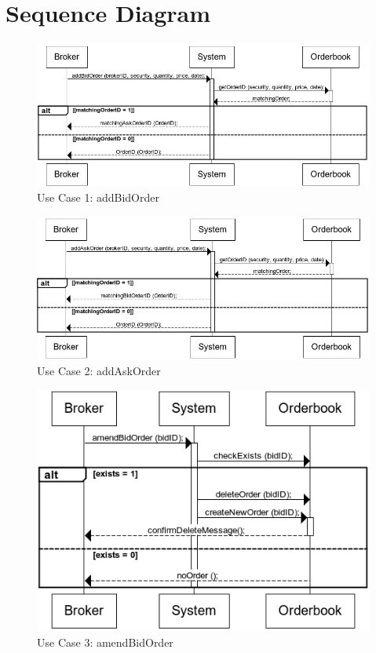 \documentclass[a4paper]{article}
\begin{document}
\section {Sequence Diagram} 

\begin{figure}[h]
  \caption{Use Case 1: addBidOrder}
  \centering
    \includegraphics[width=1\textwidth]{images/addBidOrder}
\end{figure}

\begin{figure}[h]
  \caption{Use Case 2: addAskOrder}
  \centering
    \includegraphics[width=1\textwidth]{images/addAskOrder}
\end{figure}

\newpage

\begin{figure}
  \caption{Use Case 3: amendBidOrder}
  \centering
    \includegraphics[width=1\textwidth]{images/amendBidOrder}
\end{figure}
\end{document}
